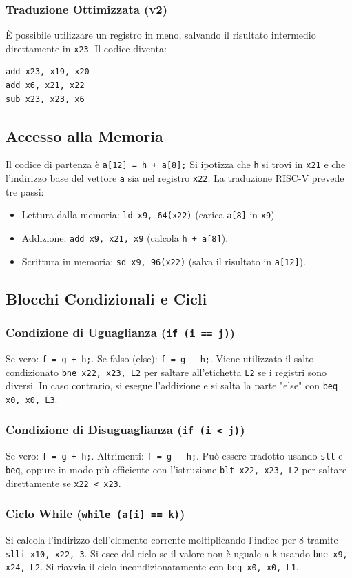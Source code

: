 \documentclass[12pt, a4paper]{article}
\begin{document}
\subsubsection{Traduzione Ottimizzata (v2)}
È possibile utilizzare un registro in meno, salvando il risultato intermedio direttamente in \texttt{x23}. Il codice diventa:
\begin{verbatim}
add x23, x19, x20
add x6, x21, x22
sub x23, x23, x6
\end{verbatim}
\subsection{Accesso alla Memoria}
Il codice di partenza è \texttt{a[12] = h + a[8];}
Si ipotizza che \texttt{h} si trovi in \texttt{x21} e che l'indirizzo base del vettore \texttt{a} sia nel registro \texttt{x22}. La traduzione RISC-V prevede tre passi:
\begin{itemize}
\item Lettura dalla memoria: \texttt{ld x9, 64(x22)} (carica \texttt{a[8]} in \texttt{x9}).
\item Addizione: \texttt{add x9, x21, x9} (calcola \texttt{h + a[8]}).
\item Scrittura in memoria: \texttt{sd x9, 96(x22)} (salva il risultato in \texttt{a[12]}).
\end{itemize}
\subsection{Blocchi Condizionali e Cicli}
\subsubsection{Condizione di Uguaglianza (\texttt{if (i == j)})}
Se vero: \texttt{f = g + h;}. Se falso (else): \texttt{f = g - h;}. Viene utilizzato il salto condizionato \texttt{bne x22, x23, L2} per saltare all'etichetta \texttt{L2} se i registri sono diversi. In caso contrario, si esegue l'addizione e si salta la parte "else" con \texttt{beq x0, x0, L3}.
\subsubsection{Condizione di Disuguaglianza (\texttt{if (i < j)})}
Se vero: \texttt{f = g + h;}. Altrimenti: \texttt{f = g - h;}. Può essere tradotto usando \texttt{slt} e \texttt{beq}, oppure in modo più efficiente con l'istruzione \texttt{blt x22, x23, L2} per saltare direttamente se \texttt{x22 < x23}.
\subsubsection{Ciclo While (\texttt{while (a[i] == k)})}
Si calcola l'indirizzo dell'elemento corrente moltiplicando l'indice per 8 tramite \texttt{slli x10, x22, 3}. Si esce dal ciclo se il valore non è uguale a \texttt{k} usando \texttt{bne x9, x24, L2}. Si riavvia il ciclo incondizionatamente con \texttt{beq x0, x0, L1}.
\end{document}
